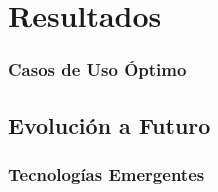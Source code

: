 \chapter{Resultados}






\subsection{Casos de Uso Óptimo}

\section{Evolución a Futuro}

\subsection{Tecnologías Emergentes}